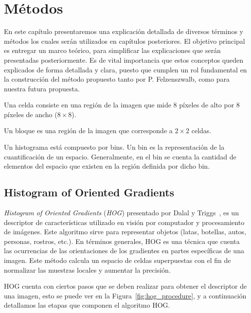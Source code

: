 \chapter[Métodos ]{Métodos }\label{ch:capitulo3}

En este capítulo presentaremos una explicación detallada de diversos términos y métodos los cuales serán utilizados en capítulos posteriores. El objetivo principal es entregar un marco teórico, para simplificar las explicaciones que serán presentadas posteriormente. Es de vital importancia que estos conceptos queden explicados de forma detallada y clara, puesto que cumplen un rol fundamental en la construcción del método propuesto tanto por P. Felzenszwalb, como para nuestra futura propuesta.

\begin{definition}[Celdas]
\label{def:cel}
Una celda consiste en una región de la imagen que mide $8$ píxeles de alto por $8$ píxeles de ancho ($8 \times 8$).
\end{definition}

\begin{definition}[Bloques]
\label{def:blo}
Un bloque es una región de la imagen que corresponde a $2 \times 2$ celdas.
\end{definition}

\begin{definition}[Bins]
\label{def:bin}
Un histograma está compuesto por bins. Un bin es la representación de la cuantificación de un espacio. Generalmente, en el bin se cuenta la cantidad de elementos del espacio que existen en la región definida por dicho bin.
\end{definition}

\section{Histogram of Oriented Gradients}\label{subsec:hog}
\textit{Histogram of Oriented Gradients} (\textit{HOG}) presentado por Dalal y Triggs~\cite{hog2005}, es un descriptor de características utilizado en visión por computador y procesamiento de imágenes. Este algoritmo sirve para representar objetos (latas, botellas, autos, personas, rostros, etc.). En términos generales, HOG es una técnica que cuenta las ocurrencias de las orientaciones de los gradientes en partes específicas de una imagen. Este método calcula un espacio de celdas superpuestas con el fin de normalizar las muestras locales y aumentar la precisión.

HOG cuenta con ciertos pasos que se deben realizar para obtener el descriptor de una imagen, esto se puede ver en la Figura~\ref{fig:hog_procedure}, y a continuación detallamos las etapas que componen el algoritmo HOG.

